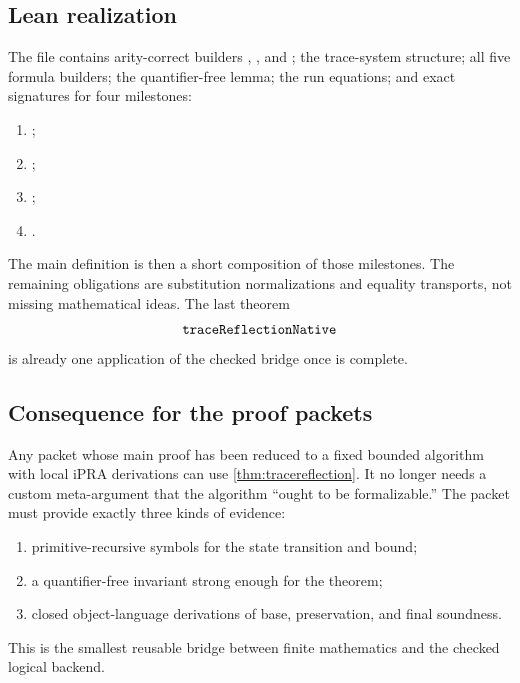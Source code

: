 \subsection{Lean realization}

The file  contains arity-correct builders
, , and ; the trace-system structure; all five
formula builders; the quantifier-free lemma; the run equations; and exact
signatures for four milestones:
\begin{enumerate}
\item {};
\item {};
\item {};
\item {}.
\end{enumerate}
The main definition  is then a short composition of
those milestones.  The remaining  obligations are substitution
normalizations and equality transports, not missing mathematical ideas.  The
last theorem
\[
 \code{traceReflectionNative}
\]
is already one application of the checked  bridge once
 is complete.

\subsection{Consequence for the proof packets}

Any packet whose main proof has been reduced to a fixed bounded algorithm with
local iPRA derivations can use \cref{thm:tracereflection}.  It no longer needs a
custom meta-argument that the algorithm ``ought to be formalizable.''  The
packet must provide exactly three kinds of evidence:
\begin{enumerate}
\item primitive-recursive symbols for the state transition and bound;
\item a quantifier-free invariant strong enough for the theorem;
\item closed object-language derivations of base, preservation, and final
soundness.
\end{enumerate}
This is the smallest reusable bridge between finite mathematics and the
checked logical backend.

